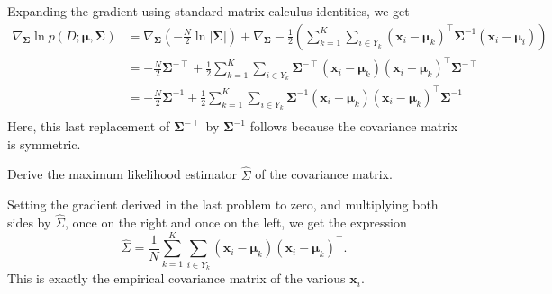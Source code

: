 \documentclass[expanded]{lkx_pset}
\begin{document}
\begin{parts}
	Expanding the gradient using standard matrix calculus identities, we get
	\[
		\begin{aligned}
			\nabla_{\bm{\Sigma}} \ln p(D; \bm{\mu}, \bm{\Sigma})
			 & = \nabla_{\bm\Sigma} \left(-\frac{N}{2}\ln|\bm\Sigma|\right) + \nabla_{\bm\Sigma} -\frac{1}{2}\left(\sum_{k=1}^K \sum_{i\in Y_k} (\bm{x}_i-\bm{\mu}_k)^\intercal \bm{\Sigma}^{-1}(\bm{x}_i - \bm{\mu}_i)\right) \\
			 & = -\frac{N}{2}\bm\Sigma^{-\intercal} + \frac{1}{2}\sum^K_{k=1}\sum_{i\in Y_k}\bm\Sigma^{-\intercal}(\bm{x}_i-\bm{\mu}_k)(\bm{x}_i-\bm{\mu}_k)^\intercal\bm\Sigma^{-\intercal}                                   \\
			 & = -\frac{N}{2}\bm\Sigma^{-1} + \frac{1}{2}\sum^K_{k=1}\sum_{i\in Y_k}\bm\Sigma^{-1}(\bm{x}_i-\bm{\mu}_k)(\bm{x}_i-\bm{\mu}_k)^\intercal\bm\Sigma^{-1}                                                           \\
		\end{aligned}
	\]
	Here, this last replacement of $\bm{\Sigma}^{-\intercal}$ by $\bm{\Sigma}^{-1}$ follows because the covariance matrix is symmetric.

	\begin{part}{6}
		Derive the maximum likelihood estimator $\widehat{\Sigma}$ of the covariance matrix.
	\end{part}
	Setting the gradient derived in the last problem to zero, and multiplying both sides by $\widehat{\Sigma}$, once on the right and once on the left, we get the expression
	\[
		\widehat{\Sigma} = \frac{1}{N}\sum^K_{k=1}\sum_{i\in Y_k} (\bm{x}_i - \bm{\mu}_k)
		(\bm{x}_i - \bm{\mu}_k)^\intercal.
	\]
	This is exactly the empirical covariance matrix of the various $\bm{x}_i$.
\end{parts}
\end{document}
